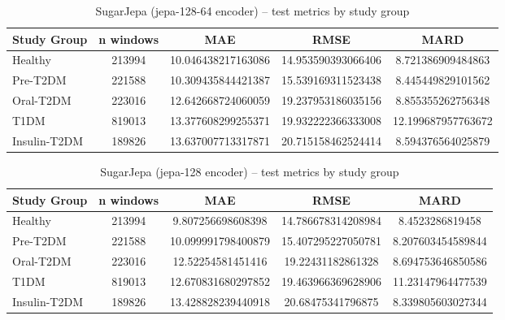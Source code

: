 \documentclass[11pt,a4paper]{article}
\begin{document}
\begin{table}[ht]
    \centering
    \begin{tabular}{lcccc}
        \hline
        Study Group & n windows & MAE & RMSE & MARD \\
        \hline
        Healthy & 213994 & 10.046438217163086 & 14.953590393066406 & 8.721386909484863 \\
        Pre-T2DM & 221588 & 10.309435844421387 & 15.539169311523438 & 8.445449829101562 \\
        Oral-T2DM & 223016 & 12.642668724060059 & 19.237953186035156 & 8.855355262756348 \\
        T1DM & 819013 & 13.377608299255371 & 19.932222366333008 & 12.199687957763672 \\
        Insulin-T2DM & 189826 & 13.637007713317871 & 20.715158462524414 & 8.594376564025879 \\
        \hline
    \end{tabular}
    \caption{SugarJepa (jepa-128-64 encoder) -- test metrics by study group}
    \label{tab:sugar-jepa-128-64-study-group-metrics}
\end{table}

\begin{table}[ht]
    \centering
    \begin{tabular}{lcccc}
        \hline
        Study Group & n windows & MAE & RMSE & MARD \\
        \hline
        Healthy & 213994 & 9.807256698608398 & 14.786678314208984 & 8.4523286819458 \\
        Pre-T2DM & 221588 & 10.099991798400879 & 15.407295227050781 & 8.207603454589844 \\
        Oral-T2DM & 223016 & 12.52254581451416 & 19.22431182861328 & 8.694753646850586 \\
        T1DM & 819013 & 12.670831680297852 & 19.463966369628906 & 11.23147964477539 \\
        Insulin-T2DM & 189826 & 13.428828239440918 & 20.68475341796875 & 8.339805603027344 \\
        \hline
    \end{tabular}
    \caption{SugarJepa (jepa-128 encoder) -- test metrics by study group}
    \label{tab:sugar-jepa-128-study-group-metrics}
\end{table}
\end{document}
